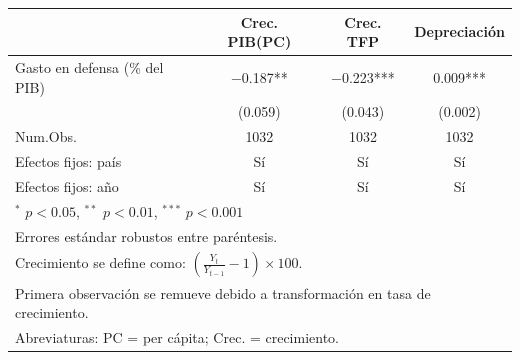 \begin{tabular}[t]{lccc}
\toprule
  & Crec. PIB(PC) & Crec. TFP & Depreciación\\
\midrule
Gasto en defensa (\% del PIB) & \num{-0.187}** & \num{-0.223}*** & \num{0.009}***\\
 & (\num{0.059}) & (\num{0.043}) & (\num{0.002})\\
\midrule
Num.Obs. & \num{1032} & \num{1032} & \num{1032}\\
Efectos fijos: país & Sí & Sí & Sí\\
Efectos fijos: año & Sí & Sí & Sí\\
\bottomrule
\multicolumn{4}{l}{\rule{0pt}{1em}{\scriptsize $^{*}$ $p<0.05$, $^{**}$ $p<0.01$, $^{***}$ $p<0.001$}}\\[-1.1em]
\multicolumn{4}{l}{\rule{0pt}{1em}{\scriptsize Errores estándar robustos entre paréntesis.}}\\[-1.1em]
\multicolumn{4}{l}{\rule{0pt}{1em}{\scriptsize Crecimiento se define como: $\left(\frac{Y_t}{Y_{t-1}} - 1\right) \times 100$.}}\\[-1.1em]
\multicolumn{4}{l}{\rule{0pt}{1em}{\scriptsize Primera observación se remueve debido a transformación en tasa de crecimiento.}}\\[-1.1em]
\multicolumn{4}{l}{\rule{0pt}{1em}{\scriptsize Abreviaturas: PC = per cápita; Crec. = crecimiento.}}\\[-1.1em]
\end{tabular}
